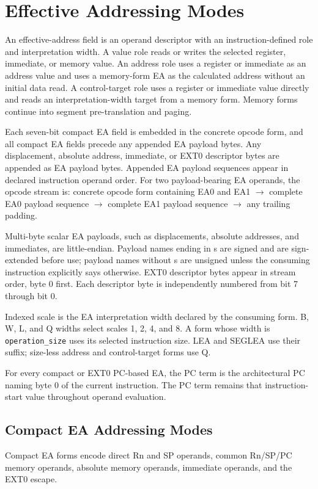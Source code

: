 \clearpage
\section{Effective Addressing Modes}\label{page:effective-addressing-modes}

An effective-address field is an operand descriptor with an instruction-defined role and interpretation width. A
value role reads or writes the selected register, immediate, or memory value. An address role uses a register or
immediate as an address value and uses a memory-form EA as the calculated address without an initial data read. A
control-target role uses a register or immediate value directly and reads an interpretation-width target from a
memory form. Memory forms continue into segment pre-translation and paging.

Each seven-bit compact EA field is embedded in the concrete opcode form, and all compact EA fields precede any
appended EA payload bytes. Any displacement, absolute address, immediate, or EXT0 descriptor bytes are appended as EA
payload bytes. Appended EA payload sequences appear in declared instruction operand order. For two payload-bearing EA
operands, the opcode stream is: concrete opcode form containing EA0 and EA1 $\rightarrow$ complete EA0 payload
sequence $\rightarrow$ complete EA1 payload sequence $\rightarrow$ any trailing padding.

Multi-byte scalar EA payloads, such as displacements, absolute addresses, and immediates, are little-endian. Payload
names ending in s are signed and are sign-extended before use; payload names without s are unsigned unless the
consuming instruction explicitly says otherwise. EXT0 descriptor bytes appear in stream order, byte 0 first. Each
descriptor byte is independently numbered from bit 7 through bit 0.

Indexed scale is the EA interpretation width declared by the consuming form. B, W, L, and Q widths select scales 1,
2, 4, and 8. A form whose width is \texttt{operation\_size} uses its selected instruction size. LEA and SEGLEA use
their suffix; size-less address and control-target forms use Q.

For every compact or EXT0 PC-based EA, the PC term is the architectural PC naming byte 0 of the current instruction.
The PC term remains that instruction-start value throughout operand evaluation.

\clearpage
\subsection{Compact EA Addressing Modes}
Compact EA forms encode direct Rn and SP operands, common Rn/SP/PC memory
operands, absolute memory operands, immediate operands, and the EXT0 escape.

